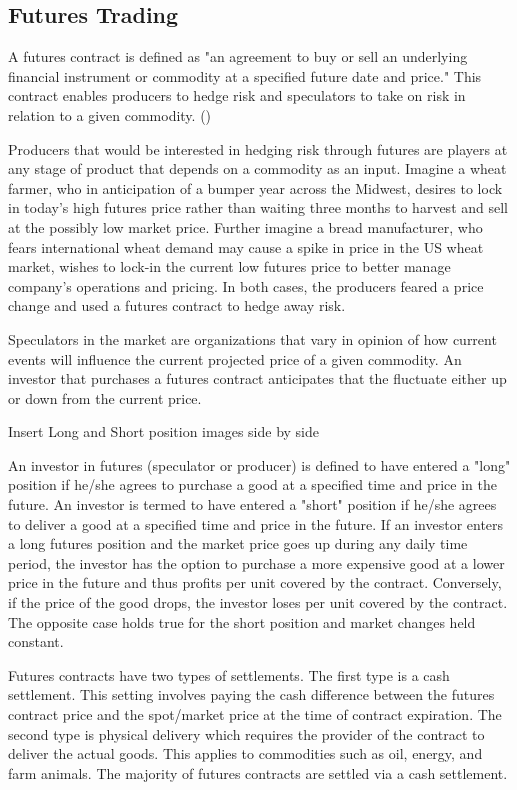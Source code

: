 \documentclass[twoside,11pt]{article}
\begin{document}
\subsection{Futures Trading}
	A futures contract is defined as "an agreement to buy or sell an underlying financial instrument or commodity at a specified future date and price." This contract enables producers to hedge risk and speculators to take on risk in relation to a given commodity. (\cite{InvestopediaF})
	
  Producers that would be interested in hedging risk through futures are players at any stage of product that depends on a commodity as an input. Imagine a wheat farmer, who in anticipation of a bumper year across the Midwest, desires to lock in today's high futures price rather than waiting three months to harvest and sell at the possibly low market price. Further imagine a bread manufacturer, who fears international wheat demand may cause a spike in price in the US wheat market, wishes to lock-in the current low futures price to better manage company's operations and pricing. In both cases, the producers feared a price change and used a futures contract to hedge away risk.
  
  Speculators in the market are organizations that vary in opinion of how current events will influence the current projected price of a given commodity. An investor that purchases a futures contract anticipates that the fluctuate either up or down from the current price.

  Insert Long and Short position images side by side

  An investor in futures (speculator or producer) is defined to have entered a "long" position if he/she agrees to purchase a good at a specified time and price in the future. An investor is termed to have entered a "short" position if he/she agrees to deliver a good at a specified time and price in the future. If an investor enters a long futures position and the market price goes up  during any daily time period, the investor has the option to purchase a more expensive good at a lower price in the future and thus profits  per unit covered by the contract. Conversely, if the price of the good drops, the investor loses  per unit covered by the contract. The opposite case holds true for the short position and market changes held constant.
  
  Futures contracts have two types of settlements. The first type is a cash settlement. This setting involves paying the cash difference between the futures contract price and the spot/market price at the time of contract expiration. The second type is physical delivery which requires the provider of the contract to deliver the actual goods. This applies to commodities such as oil, energy, and farm animals. The majority of futures contracts are settled via a cash settlement.
  
\end{document}
